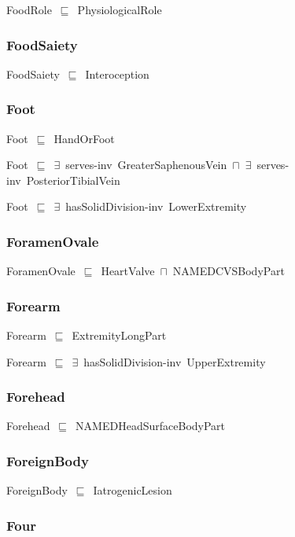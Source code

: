 \documentclass{article}
\begin{document}
FoodRole~\ensuremath{\sqsubseteq}~PhysiologicalRole~

\subsubsection*{FoodSaiety}

FoodSaiety~\ensuremath{\sqsubseteq}~Interoception~

\subsubsection*{Foot}

Foot~\ensuremath{\sqsubseteq}~HandOrFoot~

Foot~\ensuremath{\sqsubseteq}~\ensuremath{\exists}~serves-inv~GreaterSaphenousVein~\ensuremath{\sqcap}~\ensuremath{\exists}~serves-inv~PosteriorTibialVein~

Foot~\ensuremath{\sqsubseteq}~\ensuremath{\exists}~hasSolidDivision-inv~LowerExtremity~

\subsubsection*{ForamenOvale}

ForamenOvale~\ensuremath{\sqsubseteq}~HeartValve~\ensuremath{\sqcap}~NAMEDCVSBodyPart~

\subsubsection*{Forearm}

Forearm~\ensuremath{\sqsubseteq}~ExtremityLongPart~

Forearm~\ensuremath{\sqsubseteq}~\ensuremath{\exists}~hasSolidDivision-inv~UpperExtremity~

\subsubsection*{Forehead}

Forehead~\ensuremath{\sqsubseteq}~NAMEDHeadSurfaceBodyPart~

\subsubsection*{ForeignBody}

ForeignBody~\ensuremath{\sqsubseteq}~IatrogenicLesion~

\subsubsection*{Four}
\end{document}
